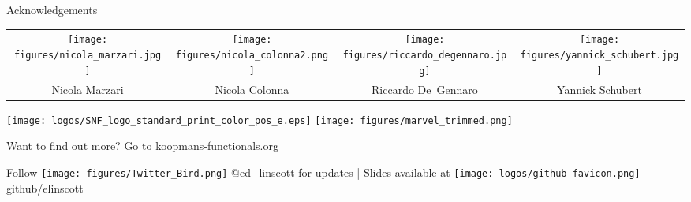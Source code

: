 \documentclass[xcolor=table,aspectratio=169]{beamer}
\numberwithin{equation}{section}
\begin{document}
\begin{frame}{Acknowledgements}
   \begin{center}
      \footnotesize
      \begin{tabularx}{\textwidth}{CCCC}
         \texttt{[image: figures/nicola\_marzari.jpg]}     &
         \texttt{[image: figures/nicola\_colonna2.png]}    &
         \texttt{[image: figures/riccardo\_degennaro.jpg]} &
         \texttt{[image: figures/yannick\_schubert.jpg]}     \\
         Nicola Marzari                                                             &
         Nicola Colonna                                                             &
         Riccardo De~Gennaro                                                        &
         Yannick Schubert                                                             \\
      \end{tabularx}
   \end{center}
   \begin{center}
      \texttt{[image: logos/SNF\_logo\_standard\_print\_color\_pos\_e.eps]}
      \hspace{1em}
      \texttt{[image: figures/marvel\_trimmed.png]}
   \end{center}

   \begin{center}
      \vspace{1em}
      \small
      Want to find out more? Go to \url{koopmans-functionals.org}
      \vspace{1em}

      Follow \texttt{[image: figures/Twitter\_Bird.png]} \textcolor{twitter_blue}{@ed\_linscott} for updates | Slides available at \texttt{[image: logos/github-favicon.png]} github/elinscott
   \end{center}

   \vspace{2ex}
   \scriptsize


   \vspace{2ex}
   \scriptsize
\end{frame}
\end{document}
